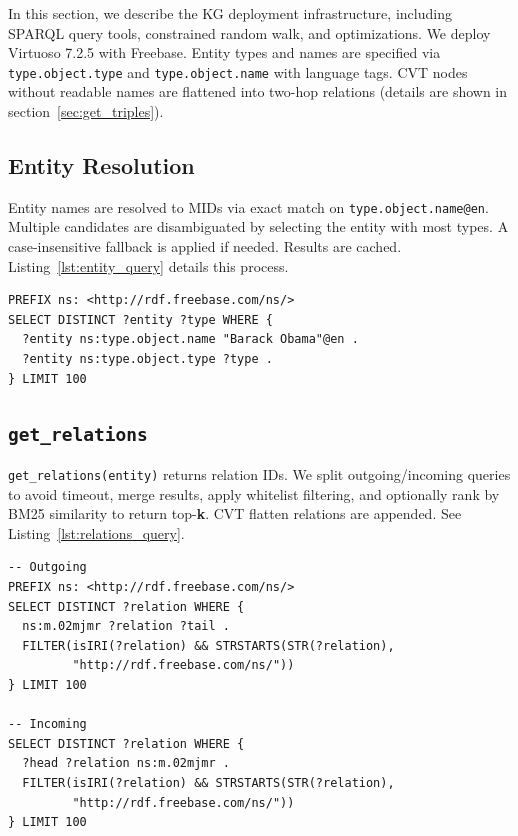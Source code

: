 In this section, we describe the KG deployment infrastructure, including SPARQL query tools, constrained random walk, and optimizations.
We deploy Virtuoso 7.2.5 with Freebase. 
Entity types and names are specified via \texttt{type.object.type} and \texttt{type.object.name} with language tags. CVT nodes without readable names are flattened into two-hop relations (details are shown in section~\ref{sec:get_triples}).



\subsection{Entity Resolution}
\label{sec:entity_resolution}

Entity names are resolved to MIDs via exact match on \texttt{type.object.name@en}. Multiple candidates are disambiguated by selecting the entity with most types. A case-insensitive fallback is applied if needed. Results are cached. Listing~\ref{lst:entity_query} details this process.


\begin{lstlisting}[caption={Entity resolution query.},label=lst:entity_query,float=ht]
PREFIX ns: <http://rdf.freebase.com/ns/>
SELECT DISTINCT ?entity ?type WHERE {
  ?entity ns:type.object.name "Barack Obama"@en .
  ?entity ns:type.object.type ?type .
} LIMIT 100
\end{lstlisting}

\subsection{\texttt{get\_relations}}
\label{sec:get_relations}

\texttt{get\_relations(entity)} returns relation IDs. We split outgoing/incoming queries to avoid timeout, merge results, apply whitelist filtering, and optionally rank by BM25 similarity to return top-\textbf{k}. CVT flatten relations are appended. See Listing~\ref{lst:relations_query}.


\begin{lstlisting}[caption={Outgoing/incoming relation queries.},label=lst:relations_query,float=ht]
-- Outgoing
PREFIX ns: <http://rdf.freebase.com/ns/>
SELECT DISTINCT ?relation WHERE {
  ns:m.02mjmr ?relation ?tail .
  FILTER(isIRI(?relation) && STRSTARTS(STR(?relation), 
         "http://rdf.freebase.com/ns/"))
} LIMIT 100

-- Incoming
SELECT DISTINCT ?relation WHERE {
  ?head ?relation ns:m.02mjmr .
  FILTER(isIRI(?relation) && STRSTARTS(STR(?relation),
         "http://rdf.freebase.com/ns/"))
} LIMIT 100
\end{lstlisting}


